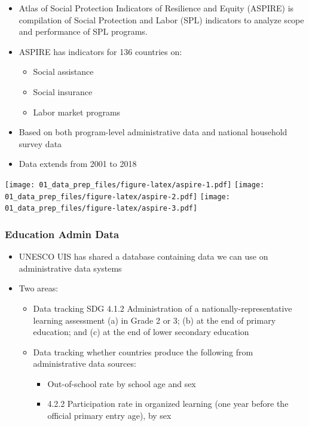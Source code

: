 \documentclass[]{article}
\providecommand{\tightlist}{%
  \setlength{\itemsep}{0pt}\setlength{\parskip}{0pt}}
\begin{document}
\begin{itemize}
\tightlist
\item
  Atlas of Social Protection Indicators of Resilience and Equity
  (ASPIRE) is compilation of Social Protection and Labor (SPL)
  indicators to analyze scope and performance of SPL programs.\\
\item
  ASPIRE has indicators for 136 countries on:

  \begin{itemize}
  \tightlist
  \item
    Social assistance\\
  \item
    Social insurance\\
  \item
    Labor market programs
  \end{itemize}
\item
  Based on both program-level administrative data and national household
  survey data\\
\item
  Data extends from 2001 to 2018
\end{itemize}

\texttt{[image: 01\_data\_prep\_files/figure-latex/aspire-1.pdf]}
\texttt{[image: 01\_data\_prep\_files/figure-latex/aspire-2.pdf]}
\texttt{[image: 01\_data\_prep\_files/figure-latex/aspire-3.pdf]}

\hypertarget{education-admin-data}{%
\subsubsection{Education Admin Data}\label{education-admin-data}}

\begin{itemize}
\item
  UNESCO UIS has shared a database containing data we can use on
  administrative data systems\\
\item
  Two areas:

  \begin{itemize}
  \item
    Data tracking SDG 4.1.2 Administration of a
    nationally-representative learning assessment (a) in Grade 2 or 3;
    (b) at the end of primary education; and (c) at the end of lower
    secondary education
  \item
    Data tracking whether countries produce the following from
    administrative data sources:

    \begin{itemize}
    \tightlist
    \item
      Out-of-school rate by school age and sex\\
    \item
      4.2.2 Participation rate in organized learning (one year before
      the official primary entry age), by sex
    \end{itemize}
  \end{itemize}
\end{itemize}
\end{document}
